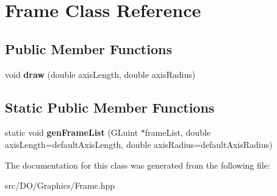 \hypertarget{class_g_l_object_1_1_frame}{\section{Frame Class Reference}
\label{class_g_l_object_1_1_frame}
}
\subsection*{Public Member Functions}
\begin{DoxyCompactItemize}
\item 
\hypertarget{class_g_l_object_1_1_frame_ad0bce7ba992dd5922dd292529412d8cc}{void {\bfseries draw} (double axis\-Length, double axis\-Radius)}\label{class_g_l_object_1_1_frame_ad0bce7ba992dd5922dd292529412d8cc}

\end{DoxyCompactItemize}
\subsection*{Static Public Member Functions}
\begin{DoxyCompactItemize}
\item 
\hypertarget{class_g_l_object_1_1_frame_a5470a7f0eb5bc728b5d439920239d783}{static void {\bfseries gen\-Frame\-List} (G\-Luint $\ast$frame\-List, double axis\-Length=default\-Axis\-Length, double axis\-Radius=default\-Axis\-Radius)}\label{class_g_l_object_1_1_frame_a5470a7f0eb5bc728b5d439920239d783}

\end{DoxyCompactItemize}


The documentation for this class was generated from the following file\-:\begin{DoxyCompactItemize}
\item 
src/\-D\-O/\-Graphics/Frame.\-hpp\end{DoxyCompactItemize}
